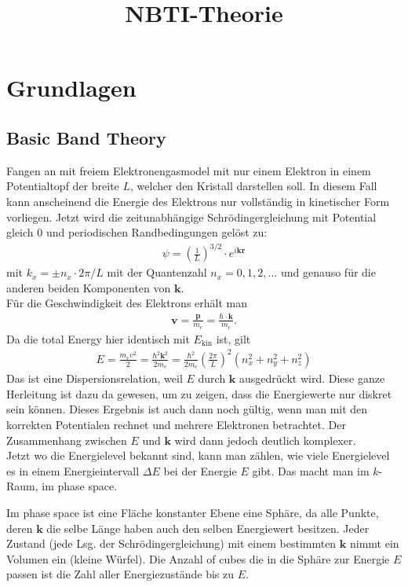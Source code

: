 \documentclass[paper=a4,10pt]{scrartcl}
\begin{document}
\title{NBTI-Theorie}

\section{Grundlagen}
\subsection{Basic Band Theory}
Fangen an mit freiem Elektronengasmodel mit nur einem Elektron in einem Potentialtopf der breite $L$, welcher den Kristall darstellen soll. In diesem Fall kann anscheinend die Energie des Elektrons nur vollständig in kinetischer Form vorliegen. Jetzt wird die zeitunabhängige Schrödingergleichung  mit Potential gleich 0 und periodischen Randbedingungen gelöst zu:
\begin{align}
\psi = \left( \frac{1}{L}	\right)^{3/2} \cdot e^{i  \bm k \bm r}
\end{align}
mit $k_x = \pm n_x \cdot 2\pi / L$ mit der Quantenzahl $n_x=0,1,2,\dots$ und genauso für die anderen beiden Komponenten von $\bm k$.\\
Für die Geschwindigkeit des Elektrons erhält man 
\begin{align}
\bm v = \frac{\bm p}{m_e} = \frac{\hbar \cdot \bm k}{m_e}.
\end{align}
Da die total Energy hier identisch mit $E_{\text{kin}}$ ist, gilt
\begin{align}
E = \frac{m_e v^2}{2} = \frac{\hbar^2 \bm k^2}{2m_e} = \frac{\hbar^2}{2m_e} \left( \frac{2\pi}{L} \right)^2 (n_x^2 +n_y^2 + n_z^2)
\end{align}
Das ist eine Dispersionsrelation, weil $E$ durch $\bm k$ ausgedrückt wird.
Diese ganze Herleitung ist dazu da gewesen, um zu zeigen, dass die Energiewerte nur diskret sein können. Dieses Ergebnis ist auch dann noch gültig, wenn man mit den korrekten Potentialen rechnet und mehrere Elektronen betrachtet. Der Zusammenhang zwischen $E$ und $\bm k$ wird dann jedoch deutlich komplexer.\\
Jetzt wo die Energielevel bekannt sind, kann man zählen, wie viele Energielevel es in einem Energieintervall $\Delta E$ bei der Energie $E$ gibt. Das macht man im $k$-Raum, im phase space.

Im phase space ist eine Fläche konstanter Ebene eine Sphäre, da alle Punkte, deren $\bm k$ die selbe Länge haben auch den selben Energiewert besitzen.
Jeder Zustand (jede Lsg. der Schrödingergleichung) mit einem bestimmten $\bm k$ nimmt ein Volumen ein (kleine Würfel).
Die Anzahl of cubes die in die Sphäre zur Energie $E$ passen ist die Zahl aller Energiezustände bis zu $E$.
\end{document}

